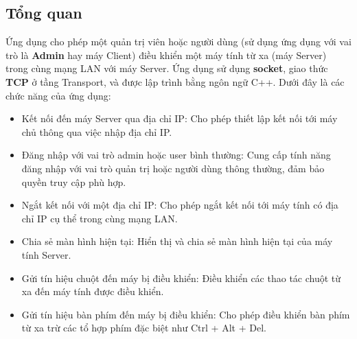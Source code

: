 \subsection{Tổng quan}
Ứng dụng cho phép một quản trị viên hoặc người dùng (sử dụng ứng dụng với vai trò là \textbf{Admin} hay máy Client) điều khiển một máy tính từ xa (máy Server) trong cùng mạng LAN với máy Server. Ứng dụng sử dụng \textbf{socket}, giao thức \textbf{TCP} ở tầng Transport, và được lập trình bằng ngôn ngữ C++. Dưới đây là các chức năng của ứng dụng:
\begin{itemize}
	\item Kết nối đến máy Server qua địa chỉ IP: Cho phép thiết lập kết nối tới máy chủ thông qua việc nhập địa chỉ IP.
	\item Đăng nhập với vai trò admin hoặc user bình thường: Cung cấp tính năng đăng nhập với vai trò quản trị hoặc người dùng thông thường, đảm bảo quyền truy cập phù hợp.	
	\item Ngắt kết nối với một địa chỉ IP: Cho phép ngắt kết nối tới máy tính có địa chỉ IP cụ thể trong cùng mạng LAN.
	\item Chia sẻ màn hình hiện tại: Hiển thị và chia sẻ màn hình hiện tại của máy tính Server.
	\item Gửi tín hiệu chuột đến máy bị điều khiển: Điều khiển các thao tác chuột từ xa đến máy tính được điều khiển.
	\item Gửi tín hiệu bàn phím đến máy bị điều khiển: Cho phép điều khiển bàn phím từ xa trừ các tổ hợp phím đặc biệt như Ctrl + Alt + Del.
\end{itemize}
